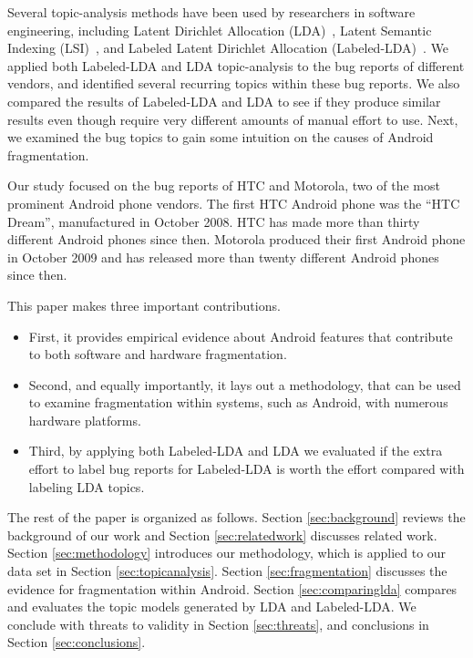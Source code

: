 \documentclass[10pt, conference, compsocconf]{IEEEtran}
\begin{document}
Several topic-analysis methods have been used by researchers in
software engineering, including Latent Dirichlet Allocation
(LDA)~\cite{Asuncion:2010,Linstead:2009}, Latent Semantic Indexing
(LSI)~\cite{Marcus04aninformation}, and Labeled Latent Dirichlet
Allocation (Labeled-LDA)~\cite{labeledlda}.
We applied both Labeled-LDA and LDA topic-analysis to the bug reports
of different vendors, and identified several recurring topics within
these bug reports.
We also compared the results of Labeled-LDA and LDA to see if they
produce similar results even though require very different amounts of
manual effort to use.
Next, we examined the bug topics to gain some intuition on the causes
of Android fragmentation.

Our study focused on the bug reports of HTC and Motorola, two of the
most prominent Android phone vendors. The first HTC Android phone was
the ``HTC Dream'', manufactured in October 2008. HTC has made more than
thirty different Android phones since then. Motorola produced their
first Android phone in October 2009 and has released more than twenty
different Android phones since then. 
 
This paper makes three important contributions.
\begin{itemize}
\item First, it provides
empirical evidence about Android features that contribute to both software
and hardware fragmentation. 
\item Second, and equally importantly, it lays
out a methodology, that can be used to examine fragmentation within
systems, such as Android, with numerous hardware platforms. 
\item Third,
by applying both Labeled-LDA and LDA we evaluated if the extra effort
to label bug reports for Labeled-LDA is worth the effort compared with
labeling LDA topics.
\end{itemize}

The rest of the paper is organized as follows. Section \ref{sec:background} reviews the
background of our work and Section \ref{sec:relatedwork} discusses related work. Section \ref{sec:methodology}
introduces our methodology, which is applied to our data set in
Section \ref{sec:topicanalysis}. Section \ref{sec:fragmentation}
discusses the evidence for fragmentation within Android. Section \ref{sec:comparinglda} compares and evaluates the topic models generated
by LDA and Labeled-LDA. 
We conclude with threats to validity in Section \ref{sec:threats},
and conclusions in
Section \ref{sec:conclusions}.
\end{document}

